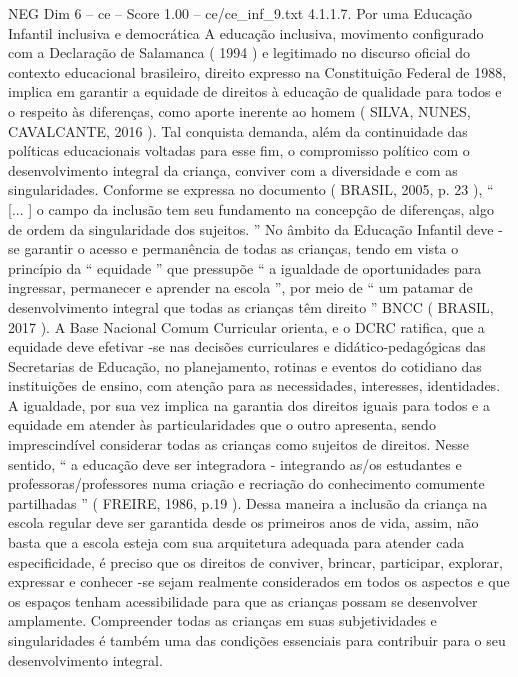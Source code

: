\begin{textsample}{NEG Dim 6 – ce – Score 1.00 – ce/ce\_inf\_9.txt}  \label{ex:f6_neg_258}
4.1.1.7.
Por uma Educação Infantil inclusiva e democrática A educação inclusiva, movimento configurado com a Declaração de Salamanca ( 1994 ) e legitimado no discurso oficial do contexto educacional brasileiro, direito expresso na Constituição Federal de 1988, implica em garantir a equidade de direitos à educação de qualidade para todos e o respeito às diferenças, como aporte inerente ao homem ( SILVA, NUNES, CAVALCANTE, 2016 ).
Tal conquista demanda, além da continuidade das políticas educacionais voltadas para esse fim, o compromisso político com o desenvolvimento integral da criança, conviver com a diversidade e com as singularidades.
Conforme se expressa no documento ( BRASIL, 2005, p. 23 ), “ [... ] o campo da inclusão tem seu fundamento na concepção de diferenças, algo de ordem da singularidade dos sujeitos. ” No âmbito da Educação Infantil deve -se garantir o acesso e permanência de todas as crianças, tendo em vista o princípio da “ equidade ” que pressupõe “ a igualdade de oportunidades para ingressar, permanecer e aprender na escola ”, por meio de “ um patamar de desenvolvimento integral que todas as crianças têm direito ” BNCC ( BRASIL, 2017 ).
A Base Nacional Comum Curricular orienta, e o DCRC ratifica, que a equidade deve efetivar -se nas decisões curriculares e didático-pedagógicas das Secretarias de Educação, no planejamento, rotinas e eventos do cotidiano das instituições de ensino, com atenção para as necessidades, interesses, identidades.
A igualdade, por sua vez implica na garantia dos direitos iguais para todos e a equidade em atender às particularidades que o outro apresenta, sendo imprescindível considerar todas as crianças como sujeitos de direitos.
Nesse sentido, “ a educação deve ser integradora - integrando as/os estudantes e professoras/professores numa criação e recriação do conhecimento comumente partilhadas ” ( FREIRE, 1986, p.19 ).
Dessa maneira a inclusão da criança na escola regular deve ser garantida desde os primeiros anos de vida, assim, não basta que a escola esteja com sua arquitetura adequada para atender cada especificidade, é preciso que os direitos de conviver, brincar, participar, explorar, expressar e conhecer -se sejam realmente considerados em todos os aspectos e que os espaços tenham acessibilidade para que as crianças possam se desenvolver amplamente.
Compreender todas as crianças em suas subjetividades e singularidades é também uma das condições essenciais para contribuir para o seu desenvolvimento integral.

\end{textsample}
